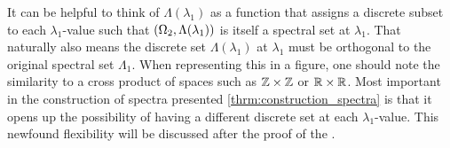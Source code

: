 \documentclass[../thesis.tex]{subfiles}
\begin{document}
\begin{remark}
    It can be helpful to think of $\Lambda(\lambda_1)$ as a function that assigns a discrete subset to each $\lambda_1$-value such that $(\Omega_2,\Lambda(\lambda_1))$ is itself a spectral set at $\lambda_1$. That naturally also means the discrete set $\Lambda(\lambda_1)$ at $\lambda_1$ must be orthogonal to the original spectral set $\Lambda_1$. When representing this in a figure, one should note the similarity to a cross product of spaces such as $\mathbb{Z} \times \mathbb{Z}$ or $\mathbb{R} \times \mathbb{R}$. Most important in the construction of spectra presented \cref{thrm:construction_spectra} is that it opens up the possibility of having a different discrete set at each $\lambda_1$-value. This newfound flexibility will be discussed after the proof of the .
\end{remark} %
\end{document}
